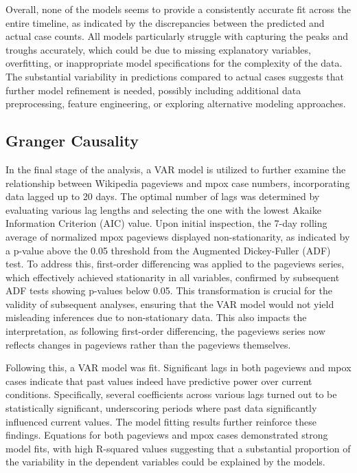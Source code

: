 \documentclass[
  12pt,
]{article}
\begin{document}
Overall, none of the models seems to provide a consistently accurate fit
across the entire timeline, as indicated by the discrepancies between
the predicted and actual case counts. All models particularly struggle
with capturing the peaks and troughs accurately, which could be due to
missing explanatory variables, overfitting, or inappropriate model
specifications for the complexity of the data. The substantial
variability in predictions compared to actual cases suggests that
further model refinement is needed, possibly including additional data
preprocessing, feature engineering, or exploring alternative modeling
approaches.

\subsection{Granger Causality}\label{granger-causality-1}

In the final stage of the analysis, a VAR model is utilized to further
examine the relationship between Wikipedia pageviews and mpox case
numbers, incorporating data lagged up to 20 days. The optimal number of
lags was determined by evaluating various lag lengths and selecting the
one with the lowest Akaike Information Criterion (AIC) value. Upon
initial inspection, the 7-day rolling average of normalized mpox
pageviews displayed non-stationarity, as indicated by a p-value above
the 0.05 threshold from the Augmented Dickey-Fuller (ADF) test. To
address this, first-order differencing was applied to the pageviews
series, which effectively achieved stationarity in all variables,
confirmed by subsequent ADF tests showing p-values below 0.05. This
transformation is crucial for the validity of subsequent analyses,
ensuring that the VAR model would not yield misleading inferences due to
non-stationary data. This also impacts the interpretation, as following
first-order differencing, the pageviews series now reflects changes in
pageviews rather than the pageviews themselves.

Following this, a VAR model was fit. Significant lags in both pageviews
and mpox cases indicate that past values indeed have predictive power
over current conditions. Specifically, several coefficients across
various lags turned out to be statistically significant, underscoring
periods where past data significantly influenced current values. The
model fitting results further reinforce these findings. Equations for
both pageviews and mpox cases demonstrated strong model fits, with high
R-squared values suggesting that a substantial proportion of the
variability in the dependent variables could be explained by the models.
\end{document}
